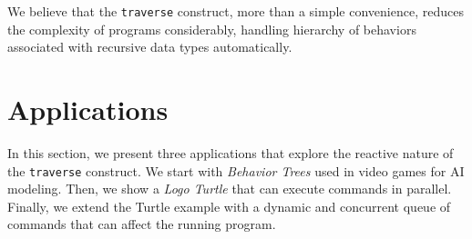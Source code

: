 \documentclass{sig-alternate}
\newcommand{\CEU}{\textsc{C\'{e}u}\xspace}
\newcommand{\code}[1] {{\small{\texttt{#1}}}}
\begin{document}
We believe that the \code{traverse} construct, more than a simple convenience, 
reduces the complexity of programs considerably, handling hierarchy of 
behaviors associated with recursive data types automatically.

\section{Applications}
\label{sec.apps}

In this section, we present three applications that explore the reactive nature 
of the \code{traverse} construct.
We start with \emph{Behavior Trees} used in video games for AI modeling.
Then, we show a \emph{Logo Turtle} that can execute commands in parallel.
Finally, we extend the Turtle example with a dynamic and concurrent queue of 
commands that can affect the running program.
\end{document}
